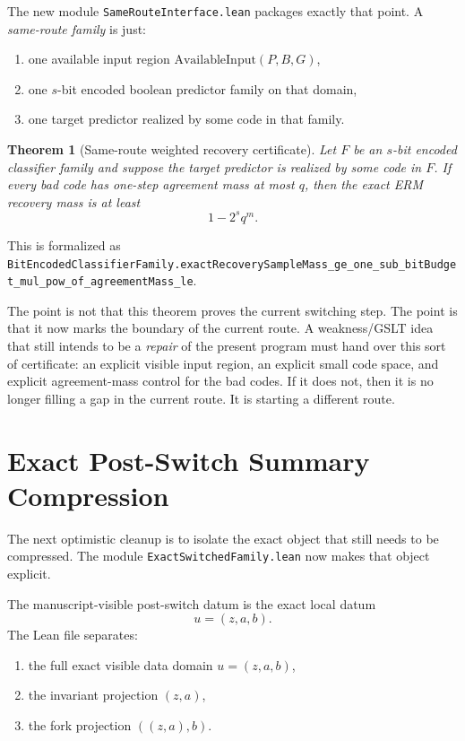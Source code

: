 \documentclass[11pt]{article}
\newtheorem{theorem}{Theorem}[section]
\theoremstyle{remark}
\begin{document}
The new module \texttt{SameRouteInterface.lean} packages exactly that point.  A
\emph{same-route family} is just:
\begin{enumerate}[leftmargin=1.5em]
  \item one available input region \(\mathrm{AvailableInput}(P,B,G)\),
  \item one \(s\)-bit encoded boolean predictor family on that domain,
  \item one target predictor realized by some code in that family.
\end{enumerate}

\begin{theorem}[Same-route weighted recovery certificate]
Let \(F\) be an \(s\)-bit encoded classifier family and suppose the target
predictor is realized by some code in \(F\).  If every bad code has one-step
agreement mass at most \(q\), then the exact ERM recovery mass is at least
\[
  1 - 2^s q^m.
\]
\end{theorem}

\noindent
This is formalized as
\texttt{BitEncodedClassifierFamily.exactRecoverySampleMass\_ge\_one\_sub\_bitBudget\_mul\_pow\_of\_agreementMass\_le}.

The point is not that this theorem proves the current switching step.  The
point is that it now marks the boundary of the current route.  A weakness/GSLT
idea that still intends to be a \emph{repair} of the present program must hand
over this sort of certificate: an explicit visible input region, an explicit
small code space, and explicit agreement-mass control for the bad codes.  If it
does not, then it is no longer filling a gap in the current route.  It is
starting a different route.

\section{Exact Post-Switch Summary Compression}

The next optimistic cleanup is to isolate the exact object that still needs to
be compressed.  The module \texttt{ExactSwitchedFamily.lean} now makes that
object explicit.

The manuscript-visible post-switch datum is the exact local datum
\[
  u = (z,a,b).
\]
The Lean file separates:
\begin{enumerate}[leftmargin=1.5em]
  \item the full exact visible data domain \(u=(z,a,b)\),
  \item the invariant projection \((z,a)\),
  \item the fork projection \(((z,a),b)\).
\end{enumerate}
\end{document}
